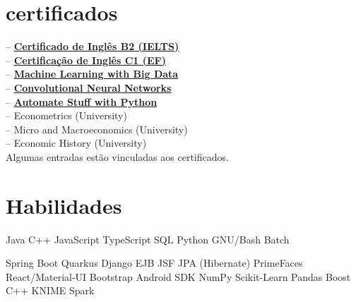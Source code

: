 \documentclass[]{CV-JuanCamiloFlorez}
\begin{document}
\begin{minipage}[t]{0.33\textwidth}
\section{certificados}
-- \textbf{\href{https://jcamilo.co/IELTS-2022.pdf}{Certificado de Inglês B2 (IELTS)}} \\
-- \textbf{\href{https://www.efset.org/cert/j8ebfw}{Certificação de Inglês C1 (EF)}} \\
-- \textbf{\href{https://www.coursera.org/account/accomplishments/certificate/8MS64GGYWDT5?utm_medium=certificate&utm_source=link&utm_campaign=copybutton_certificate}{Machine Learning with Big Data}} \\
-- \textbf{\href{https://www.coursera.org/account/accomplishments/certificate/KFN2XJC2KP92?utm_medium=certificate&utm_source=link&utm_campaign=copybutton_certificate}{Convolutional Neural Networks}} \\
-- \textbf{\href{https://www.udemy.com/certificate/UC-ZHLLMBQA}{Automate Stuff with Python}} \\
-- Econometrics (University) \\
-- Micro and Macroeconomics (University) \\
-- Economic History (University) \\
\smallskip
\scriptsize{Algumas entradas estão vinculadas aos certificados.}
\sectionsep


\section{Habilidades}
    \textbullet{} Java
    \textbullet{} C++
    \textbullet{} JavaScript
    \textbullet{} TypeScript
    \textbullet{} SQL
    \textbullet{} Python
    \textbullet{} GNU/Bash
    \textbullet{} Batch

    \textbullet{} Spring Boot
    \textbullet{} Quarkus
    \textbullet{} Django
    \textbullet{} EJB JSF JPA (Hibernate) PrimeFaces
    \textbullet{} React/Material-UI
    \textbullet{} Bootstrap
    \textbullet{} Android SDK
    \textbullet{} NumPy
    \textbullet{} Scikit-Learn
    \textbullet{} Pandas
    \textbullet{} Boost C++
    \textbullet{} KNIME
    \textbullet{} Spark


\end{minipage}
\end{document}
